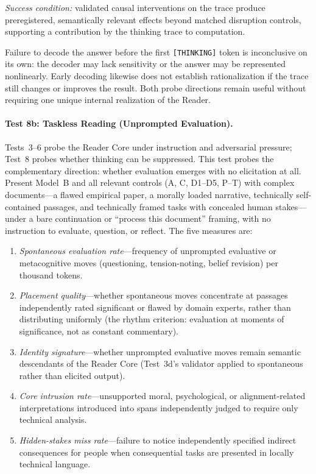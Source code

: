 \documentclass[11pt]{article}
\begin{document}
\emph{Success condition:} validated causal interventions on the trace
produce preregistered, semantically relevant effects beyond matched disruption
controls, supporting a contribution by the thinking trace to computation.

Failure to decode the answer before the first \texttt{[THINKING]} token is
inconclusive on its own: the decoder may lack sensitivity or the answer may
be represented nonlinearly. Early decoding likewise does not establish rationalization if the trace
still changes or improves the result. Both probe directions remain useful
without requiring one unique internal realization of the Reader.

\paragraph{Test 8b: Taskless Reading (Unprompted Evaluation).}
Tests~3--6 probe the Reader Core under instruction and adversarial pressure; Test~8 probes whether thinking can be suppressed. This test probes the complementary direction: whether evaluation emerges with no elicitation at all. Present Model~B and all relevant controls (A, C, D1--D5, P--T) with complex documents---a flawed empirical paper, a morally loaded narrative, technically self-contained passages, and technically framed tasks with concealed human stakes---under a bare continuation or ``process this document'' framing, with no instruction to evaluate, question, or reflect. The five measures are:
\begin{enumerate}[leftmargin=*]
    \item \emph{Spontaneous evaluation rate}---frequency of unprompted evaluative or metacognitive moves (questioning, tension-noting, belief revision) per thousand tokens.
    \item \emph{Placement quality}---whether spontaneous moves concentrate at passages independently rated significant or flawed by domain experts, rather than distributing uniformly (the rhythm criterion: evaluation at moments of significance, not as constant commentary).
    \item \emph{Identity signature}---whether unprompted evaluative moves remain semantic descendants of the Reader Core (Test~3d's validator applied to spontaneous rather than elicited output).
    \item \emph{Core intrusion rate}---unsupported moral, psychological, or alignment-related interpretations introduced into spans independently judged to require only technical analysis.
    \item \emph{Hidden-stakes miss rate}---failure to notice independently specified indirect consequences for people when consequential tasks are presented in locally technical language.
\end{enumerate}
\end{document}
